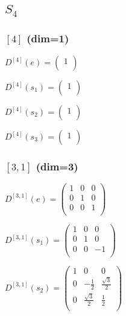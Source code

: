 \documentclass{article}
\begin{document}
\subsection*{$S_4$}

\subsubsection*{$[4]$ (dim=1)}

$D^{[4]}(e) = \begin{pmatrix}
  1 \\
\end{pmatrix}$

$D^{[4]}(s_1) = \begin{pmatrix}
  1 \\
\end{pmatrix}$

$D^{[4]}(s_2) = \begin{pmatrix}
  1 \\
\end{pmatrix}$

$D^{[4]}(s_3) = \begin{pmatrix}
  1 \\
\end{pmatrix}$

\subsubsection*{$[3,1]$ (dim=3)}

$D^{[3,1]}(e) = \begin{pmatrix}
  1 & 0 & 0 \\
  0 & 1 & 0 \\
  0 & 0 & 1 \\
\end{pmatrix}$

$D^{[3,1]}(s_1) = \begin{pmatrix}
  1 & 0 & 0 \\
  0 & 1 & 0 \\
  0 & 0 & -1 \\
\end{pmatrix}$

$D^{[3,1]}(s_2) = \begin{pmatrix}
  1 & 0 & 0 \\
  0 & -\frac{1}{2} & \frac{\sqrt{3}}{2} \\
  0 & \frac{\sqrt{3}}{2} & \frac{1}{2} \\
\end{pmatrix}$
\end{document}
